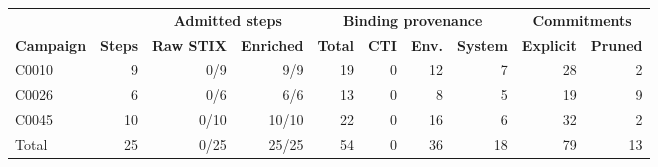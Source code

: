 \begin{tabular*}{\textwidth}{@{\extracolsep{\fill}}lrrrrrrrrr@{}}
\toprule
 & & \multicolumn{2}{c}{\textbf{Admitted steps}} & \multicolumn{4}{c}{\textbf{Binding provenance}} & \multicolumn{2}{c}{\textbf{Commitments}} \\
\cmidrule(lr){3-4}\cmidrule(lr){5-8}\cmidrule(lr){9-10}
\textbf{Campaign} & \textbf{Steps} & \textbf{Raw STIX} & \textbf{Enriched} & \textbf{Total} & \textbf{CTI} & \textbf{Env.} & \textbf{System} & \textbf{Explicit} & \textbf{Pruned} \\
\midrule
C0010 & 9 & 0/9 & 9/9 & 19 & 0 & 12 & 7 & 28 & 2 \\
C0026 & 6 & 0/6 & 6/6 & 13 & 0 & 8 & 5 & 19 & 9 \\
C0045 & 10 & 0/10 & 10/10 & 22 & 0 & 16 & 6 & 32 & 2 \\
\midrule
Total & 25 & 0/25 & 25/25 & 54 & 0 & 36 & 18 & 79 & 13 \\
\bottomrule
\end{tabular*}
